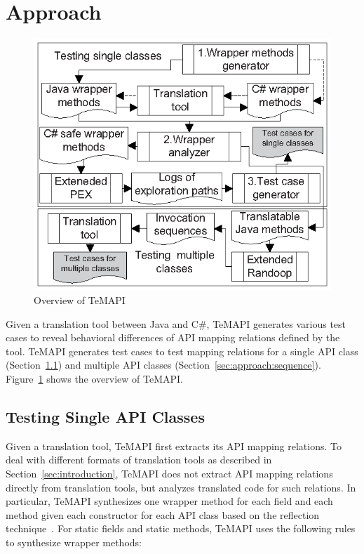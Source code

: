 \section{Approach}
\label{sec:approach}
\begin{figure}[t]
\centering
\includegraphics[scale=1,clip]{figure/approach.eps}\vspace*{-3ex}
 \caption{Overview of TeMAPI}\vspace*{-4ex}
 \label{fig:approach}
\end{figure}

Given a translation tool between Java and C\#, TeMAPI generates various test cases to reveal behavioral differences of API mapping relations defined by the tool. TeMAPI generates test cases to test mapping relations for a single API class (Section~\ref{sec:approach:single}) and multiple API classes (Section~\ref{sec:approach:sequence}). Figure~\ref{fig:approach} shows the overview of TeMAPI. 


\subsection{Testing Single API Classes}
\label{sec:approach:single}
Given a translation tool, TeMAPI first extracts its API mapping relations. To deal with different formats of translation tools as described in Section~\ref{sec:introduction}, TeMAPI does not extract API mapping relations directly from translation tools, but analyzes translated code for such relations. In particular, TeMAPI synthesizes one wrapper method for each field and each method given each constructor for each API class based on the reflection technique~\cite{maes1987concepts}. For static fields and static methods, TeMAPI uses the following rules to synthesize wrapper methods:


